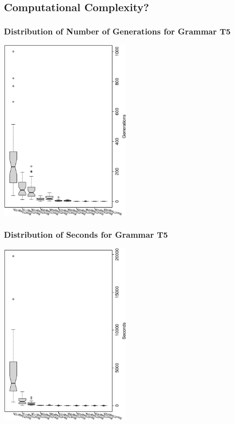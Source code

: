 \documentclass[18pt,c]{beamer}
\begin{document}
\subsection{Computational Complexity?}
 \begin{frame}
 \frametitle{ Distribution of Number of Generations for Grammar T5 }
 \begin{center}
\includegraphics[width=0.5\textwidth, angle=-90]
{ExpFboxplottGenerations011.eps}
 \end{center}
 \label{ExpFboxplottGenerations011.eps}  
 \end{frame}

 \begin{frame}
 \frametitle{ Distribution of Seconds for Grammar T5 }
 \begin{center}
\includegraphics[width=0.5\textwidth, angle=-90]
{ExpFboxplottSeconds011.eps}
 \end{center}
 \label{ExpFboxplottSeconds011.eps}  
 \end{frame}
\end{document}
